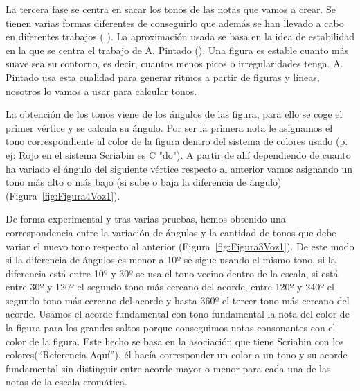 La tercera fase se centra en sacar los tonos de las notas que vamos a crear. Se tienen varias formas diferentes de conseguirlo que además se han llevado a cabo en diferentes trabajos (\cite{bricksConvertsMusic} \cite{ImageBaseComposition}). La aproximación usada se basa en la idea de estabilidad en la que se centra el trabajo de A. Pintado (\cite{portutesis}). Una figura es estable cuanto más suave sea su contorno, es decir, cuantos menos picos o irregularidades tenga. A. Pintado usa esta cualidad para generar ritmos a partir de figuras y líneas, nosotros lo vamos a usar para calcular tonos.

La obtención de los tonos viene de los ángulos de las figura, para ello se coge el primer vértice y se calcula su ángulo. Por ser la primera nota le asignamos el tono correspondiente al color de la figura dentro del sistema de colores usado (p. ej: Rojo en el sistema Scriabin es C "do"). A partir de ahí dependiendo de cuanto ha variado el ángulo del siguiente vértice respecto al anterior vamos asignando un tono más alto o más bajo (si sube o baja la diferencia de ángulo) (Figura~\ref{fig:Figura4Voz1}).

De forma experimental y tras varias pruebas, hemos obtenido una correspondencia entre la variación de ángulos y la cantidad de tonos que debe variar el nuevo tono respecto al anterior (Figura~\ref{fig:Figura3Voz1}). De este modo si la diferencia de ángulos es menor a 10º se sigue usando el mismo tono, si la diferencia está entre 10º y 30º se usa el tono vecino dentro de la escala, si está entre 30º y 120º el segundo tono más cercano del acorde, entre 120º y 240º el segundo tono más cercano del acorde y hasta 360º el tercer tono más cercano del acorde. Usamos el acorde fundamental con tono fundamental la nota del color de la figura para los grandes saltos porque conseguimos notas consonantes con el color de la figura. Este hecho se basa en la asociación que tiene Scriabin con los colores(``Referencia Aquí''), él hacía corresponder un color a un tono y su acorde fundamental sin distinguir entre acorde mayor o menor para cada una de las notas de la escala cromática.

